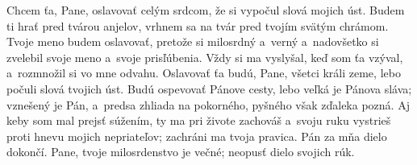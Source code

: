 Chcem ťa, Pane, oslavovať celým srdcom,
že si vypočul slová mojich úst.
\versseparator
Budem ti hrať pred tvárou anjelov,
vrhnem sa na tvár pred tvojím svätým chrámom.
Tvoje meno budem oslavovať,
\versseparator
pretože si milosrdný a~verný
a~nadovšetko si zvelebil svoje meno a~svoje prisľúbenia.
\versseparator
Vždy si ma vyslyšal, keď som ťa vzýval,
a~rozmnožil si vo mne odvahu.
\versseparator
Oslavovať ťa budú, Pane, všetci králi zeme,
lebo počuli slová tvojich úst.
\versseparator
Budú ospevovať Pánove cesty,
lebo veľká je Pánova sláva;
\versseparator
vznešený je Pán, a~predsa zhliada na pokorného,
pyšného však zďaleka pozná.
\versseparator
Aj keby som mal prejsť súžením, ty ma pri živote zachováš
a~svoju ruku vystrieš proti hnevu mojich nepriateľov;
zachráni ma tvoja pravica.
\versseparator
Pán za mňa dielo dokončí.
Pane, tvoje milosrdenstvo je večné;
neopusť dielo svojich rúk.